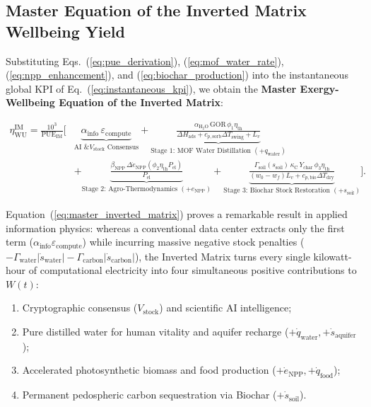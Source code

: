 \documentclass[aps,pre,twocolumn,10pt,superscriptaddress,amsmath,amssymb,amsfonts,floatfix,showkeys]{revtex4-2}
\begin{document}
\subsection{Master Equation of the Inverted Matrix Wellbeing Yield}

Substituting Eqs.~(\ref{eq:pue_derivation}), (\ref{eq:mof_water_rate}), (\ref{eq:npp_enhancement}), and (\ref{eq:biochar_production}) into the instantaneous global KPI of Eq.~(\ref{eq:instantaneous_kpi}), we obtain the \textbf{Master Exergy-Wellbeing Equation of the Inverted Matrix}:
\begin{widetext}
\begin{equation}
\begin{aligned}
    \eta_{\text{WU}}^{\text{IM}} = \frac{10^3}{\text{PUE}_{\text{IM}}} \Bigg[ 
    &\underbrace{\alpha_{\text{info}} \, \varepsilon_{\text{compute}}}_{\text{AI \& } V_{\text{stock}}\text{ Consensus}}
    + \underbrace{\frac{\alpha_{\text{H}_2\text{O}} \, \text{GOR} \, \phi_1 \eta_{\text{th}}}{\Delta H_{\text{ads}} + c_{p,\text{sorb}} \Delta T_{\text{swing}} + L_v}}_{\text{Stage 1: MOF Water Distillation } (+q_{\text{water}})} \\
    &+ \underbrace{\frac{\beta_{\text{NPP}} \, \Delta \dot{e}_{\text{NPP}}(\phi_2 \eta_{\text{th}} P_{\text{el}})}{P_{\text{el}}}}_{\text{Stage 2: Agro-Thermodynamics } (+e_{\text{NPP}})}
    + \underbrace{\frac{\Gamma_{\text{soil}}(s_{\text{soil}}) \, \kappa_{\text{C}} \, Y_{\text{char}} \, \phi_3 \eta_{\text{th}}}{(w_0 - w_f) L_v + c_{p,\text{bio}} \Delta T_{\text{dry}}}}_{\text{Stage 3: Biochar Stock Restoration } (+s_{\text{soil}})}
    \Bigg].
\end{aligned}
\label{eq:master_inverted_matrix}
\end{equation}
\end{widetext}

Equation~(\ref{eq:master_inverted_matrix}) proves a remarkable result in applied information physics: whereas a conventional data center extracts only the first term ($\alpha_{\text{info}} \varepsilon_{\text{compute}}$) while incurring massive negative stock penalties ($-\Gamma_{\text{water}}|\dot{s}_{\text{water}}| - \Gamma_{\text{carbon}}|\dot{s}_{\text{carbon}}|$), the Inverted Matrix turns every single kilowatt-hour of computational electricity into four simultaneous positive contributions to $W(t)$:
\begin{enumerate}
    \item Cryptographic consensus ($V_{\text{stock}}$) and scientific AI intelligence;
    \item Pure distilled water for human vitality and aquifer recharge ($+\dot{q}_{\text{water}}, +\dot{s}_{\text{aquifer}}$);
    \item Accelerated photosynthetic biomass and food production ($+\dot{e}_{\text{NPP}}, +\dot{q}_{\text{food}}$);
    \item Permanent pedospheric carbon sequestration via Biochar ($+\dot{s}_{\text{soil}}$).
\end{enumerate}
\end{document}
